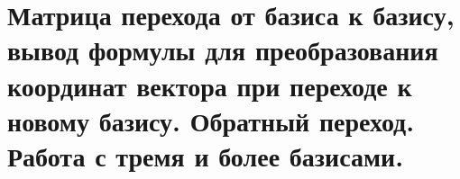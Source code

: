 \section{
    Матрица перехода от базиса к базису, вывод формулы для преобразования координат вектора при переходе к новому базису. Обратный переход. Работа с тремя и более базисами.
}






\newpage



